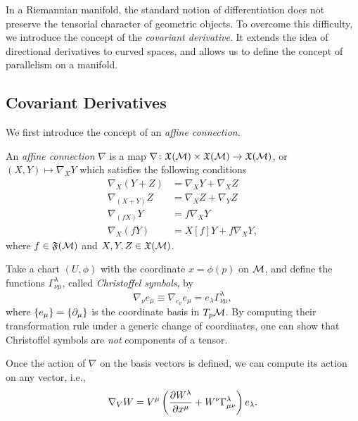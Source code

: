 In a Riemannian manifold, the standard notion of differentiation does not preserve the tensorial character of geometric objects. To overcome this difficulty, we introduce the concept of the \emph{covariant derivative}. It extends the idea of directional derivatives to curved spaces, and allows us to define the concept of parallelism on a manifold.

\subsection{Covariant Derivatives}
We first introduce the concept of an \emph{affine connection}.
\begin{definition}
    An \emph{affine connection} $\nabla$ is a map $\nabla \colon \mathfrak{X}(\mathcal{M}) \times \mathfrak{X}(\mathcal{M}) \to \mathfrak{X}(\mathcal{M})$, or $(X,Y) \mapsto \nabla_X Y$ which satisfies the following conditions
    \begin{subequations}
        \begin{align}
            \nabla_X (Y + Z) &= \nabla_X Y + \nabla_X Z \\
            \nabla_{(X+Y)} Z &= \nabla_X Z + \nabla_Y Z \\
            \nabla_{(fX)} Y &= f \nabla_X Y \\
            \nabla_X (fY) &= X[f] Y + f \nabla_X Y,
        \end{align}
    \end{subequations}
    where $f \in \mathfrak{F}(\mathcal{M})$ and $X,Y,Z \in \mathfrak{X}(\mathcal{M})$.
\end{definition}

Take a chart $(U, \phi)$ with the coordinate $x = \phi(p)$ on $\mathcal{M}$, and define the functions $\Gamma^\lambda_{\nu\mu}$, called \emph{Christoffel symbols}, by
\begin{equation}
    \nabla_\nu e_\mu \equiv \nabla_{e_\nu} e_\mu = e_\lambda \Gamma^\lambda_{\nu\mu},
\end{equation}
where $\{e_\mu\} = \{\partial_\mu\}$ is the coordinate basis in $T_p \mathcal{M}$. By computing their transformation rule under a generic change of coordinates, one can show that Christoffel symbols are \emph{not} components of a tensor.

Once the action of $\nabla$ on the basis vectors is defined, we can compute its action on any vector, i.e.,
\begin{equation}\label{eq:def-cov-der}
    \nabla_V W = V^\mu \left( \frac{\partial W^\lambda}{\partial x^\mu} + W^\nu \Gamma^\lambda_{\mu\nu} \right) e_\lambda .
\end{equation}

